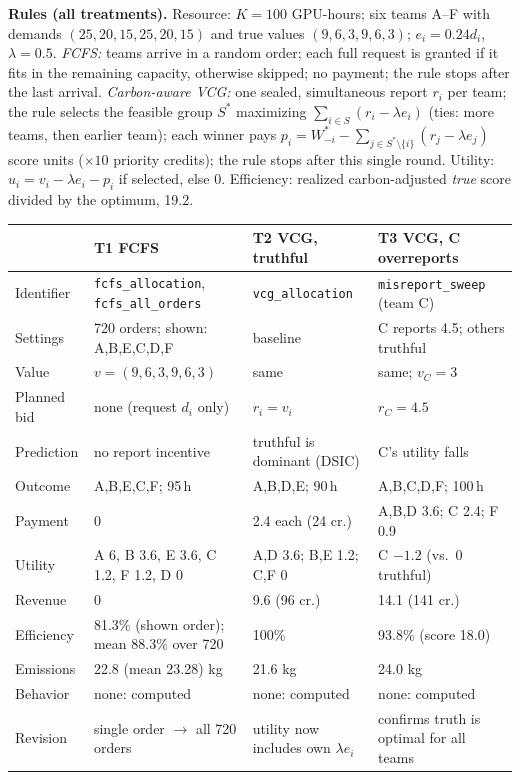 \textbf{Rules (all treatments).} Resource: $K=100$ GPU-hours; six teams A--F with demands $(25,20,15,25,20,15)$ and true values $(9,6,3,9,6,3)$; $e_i=0.24d_i$, $\lambda=0.5$.
\emph{FCFS:} teams arrive in a random order; each full request is granted if it fits in the remaining capacity, otherwise skipped; no payment; the rule stops after the last arrival.
\emph{Carbon-aware VCG:} one sealed, simultaneous report $r_i$ per team; the rule selects the feasible group $S^*$ maximizing $\sum_{i\in S}(r_i-\lambda e_i)$ (ties: more teams, then earlier team); each winner pays $p_i=W^*_{-i}-\sum_{j\in S^*\setminus\{i\}}(r_j-\lambda e_j)$ score units ($\times10$ priority credits); the rule stops after this single round.
Utility: $u_i=v_i-\lambda e_i-p_i$ if selected, else $0$. Efficiency: realized carbon-adjusted \emph{true} score divided by the optimum, 19.2.

{\footnotesize
\begin{tabularx}{\columnwidth}{@{}p{1.45cm}YYY@{}}\toprule
 & \textbf{T1 FCFS} & \textbf{T2 VCG, truthful} & \textbf{T3 VCG, C overreports}\\\midrule
Identifier & \texttt{fcfs\_allocation}, \texttt{fcfs\_all\_orders} & \texttt{vcg\_allocation} & \texttt{misreport\_sweep} (team C)\\
Settings & 720 orders; shown: A,B,E,C,D,F & baseline & C reports 4.5; others truthful\\
Value & $v=(9,6,3,9,6,3)$ & same & same; $v_C=3$\\
Planned bid & none (request $d_i$ only) & $r_i=v_i$ & $r_C=4.5$\\
Prediction & no report incentive & truthful is dominant (DSIC) & C's utility falls\\
Outcome & A,B,E,C,F; 95\,h & A,B,D,E; 90\,h & A,B,C,D,F; 100\,h\\
Payment & 0 & 2.4 each (24 cr.) & A,B,D 3.6; C 2.4; F 0.9\\
Utility & A 6, B 3.6, E 3.6, C 1.2, F 1.2, D 0 & A,D 3.6; B,E 1.2; C,F 0 & C $-1.2$ (vs.\ 0 truthful)\\
Revenue & 0 & 9.6 (96 cr.) & 14.1 (141 cr.)\\
Efficiency & 81.3\% (shown order); mean 88.3\% over 720 & 100\% & 93.8\% (score 18.0)\\
Emissions & 22.8 (mean 23.28) kg & 21.6 kg & 24.0 kg\\
Behavior & none: computed & none: computed & none: computed\\
Revision & single order $\to$ all 720 orders & utility now includes own $\lambda e_i$ & confirms truth is optimal for all teams\\\bottomrule
\end{tabularx}}

